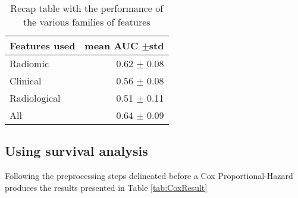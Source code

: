 \begin{table}
\caption{Recap table with the performance of the various families of features \label{tab:RecapicuRF}}
\centering
\begin{tabular}{l|r}
\toprule
Features used & mean AUC $\pm$std\\
\midrule
Radiomic  & 0.62 $\pm$ 0.08\\
Clinical  &  0.56 $\pm$ 0.08\\
Radiological & 0.51 $\pm$ 0.11\\
All & 0.64 $\pm$ 0.09\\
\bottomrule
\end{tabular}
\end{table}

\subsection{Using survival analysis}
Following the preprocessing steps delineated before a Cox Proportional-Hazard produces the results presented in Table \ref{tab:CoxResult}

